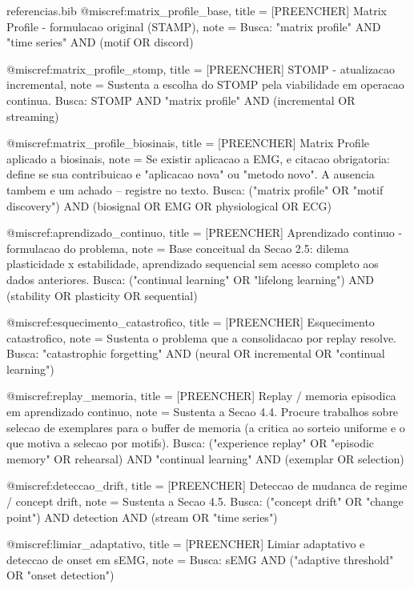 \begin{filecontents*}[overwrite]{referencias.bib}
@misc{ref:matrix_profile_base,
  title = {[PREENCHER] Matrix Profile - formulacao original (STAMP)},
  note  = {Busca: "matrix profile" AND "time series" AND (motif OR
           discord)}
}

@misc{ref:matrix_profile_stomp,
  title = {[PREENCHER] STOMP - atualizacao incremental},
  note  = {Sustenta a escolha do STOMP pela viabilidade em operacao
           continua. Busca: STOMP AND "matrix profile" AND (incremental
           OR streaming)}
}

@misc{ref:matrix_profile_biosinais,
  title = {[PREENCHER] Matrix Profile aplicado a biosinais},
  note  = {Se existir aplicacao a EMG, e citacao obrigatoria: define se
           sua contribuicao e "aplicacao nova" ou "metodo novo". A
           ausencia tambem e um achado -- registre no texto.
           Busca: ("matrix profile" OR "motif discovery") AND
           (biosignal OR EMG OR physiological OR ECG)}
}

@misc{ref:aprendizado_continuo,
  title = {[PREENCHER] Aprendizado continuo - formulacao do problema},
  note  = {Base conceitual da Secao 2.5: dilema plasticidade x
           estabilidade, aprendizado sequencial sem acesso completo aos
           dados anteriores.
           Busca: ("continual learning" OR "lifelong learning") AND
           (stability OR plasticity OR sequential)}
}

@misc{ref:esquecimento_catastrofico,
  title = {[PREENCHER] Esquecimento catastrofico},
  note  = {Sustenta o problema que a consolidacao por replay resolve.
           Busca: "catastrophic forgetting" AND (neural OR incremental
           OR "continual learning")}
}

@misc{ref:replay_memoria,
  title = {[PREENCHER] Replay / memoria episodica em aprendizado
           continuo},
  note  = {Sustenta a Secao 4.4. Procure trabalhos sobre selecao de
           exemplares para o buffer de memoria (a critica ao sorteio
           uniforme e o que motiva a selecao por motifs).
           Busca: ("experience replay" OR "episodic memory" OR
           rehearsal) AND "continual learning" AND (exemplar OR
           selection)}
}

@misc{ref:deteccao_drift,
  title = {[PREENCHER] Deteccao de mudanca de regime / concept drift},
  note  = {Sustenta a Secao 4.5. Busca: ("concept drift" OR "change
           point") AND detection AND (stream OR "time series")}
}

@misc{ref:limiar_adaptativo,
  title = {[PREENCHER] Limiar adaptativo e deteccao de onset em sEMG},
  note  = {Busca: sEMG AND ("adaptive threshold" OR "onset detection")}
}


\end{filecontents*}
